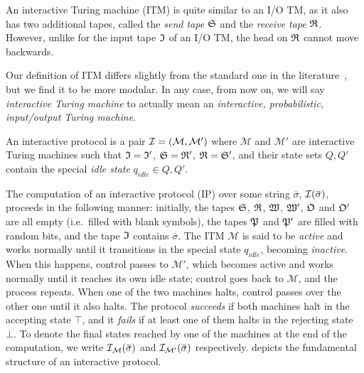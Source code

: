 An interactive Turing machine (ITM) is quite similar to an I/O TM, as it also has two additional 
tapes, called the \emph{send tape} \(\mathfrak{S} \) and the \emph{receive tape} \(\mathfrak{R} \).
However, unlike for the input tape \(\mathfrak{I} \) of an I/O TM, the head on \(\mathfrak{R} \) cannot move 
backwards.
\begin{remark}  
  Our definition of ITM differs slightly from the standard one in the 
  literature~\cite{GoldreichMW1991,GoldwasserMR1989}, but we find it to be more modular.
  In any case, from now on, we will say \emph{interactive Turing machine} to actually mean an 
 \emph{interactive, probabilistic, input/output Turing machine}.
\end{remark}

\begin{definition}
  An interactive protocol is a pair \(\mathcal{I} = \left(\mathcal{M}, \mathcal{M'}\right)\)
  where \(\mathcal{M}\) and \(\mathcal{M'}\) are interactive Turing machines such that 
  \(\mathfrak{I} = \mathfrak{I}'\), \(\mathfrak{S} = \mathfrak{R}' \), \(\mathfrak{R} = \mathfrak{S}'\), and their 
  state sets \(Q, Q'\) contain the special \emph{idle state} \(q_{idle} \in Q, Q'\).
\end{definition}

The computation of an interactive protocol (IP) over some string \(\overbar{\sigma}\), 
\(\call{\mathcal{I}}{\overbar{\sigma}}\), proceeds in the following manner: 
initially, the tapes \(\mathfrak{S} \), \(\mathfrak{R} \), \(\mathfrak{W} \), \(\mathfrak{W}' \), \(\mathfrak{O} \) 
and \(\mathfrak{O}' \) are all empty (i.e.\ filled with blank symbols), the tapes \(\mathfrak{P} \) and 
\(\mathfrak{P}' \) are filled with random bits, and the tape \(\mathfrak{I} \) contains \(\overbar{\sigma}\).
The ITM \(\mathcal{M}\) is said to be \emph{active} and works normally until it transitions in the 
special state \(q_{idle}\), becoming \emph{inactive}.
When this happens, control passes to \(\mathcal{M}'\), which becomes active and works normally 
until it reaches its own idle state; control goes back to \(\mathcal{M}\), and the process repeats.
When one of the two machines halts, control passes over the other one until it also halts.
The protocol \emph{succeeds} if both machines halt in the accepting state \(\top \), and it 
\emph{fails} if at least one of them halts in the rejecting state \(\bot \).
To denote the final states reached by one of the machines at the end of the computation, 
we write \(\call{\mathcal{I}_{\mathcal{M}}}{\overbar{\sigma}}\) and 
\(\call{\mathcal{I}_{\mathcal{M}'}}{\overbar{\sigma}}\) respectively.
 depicts the fundamental structure of an interactive protocol.


